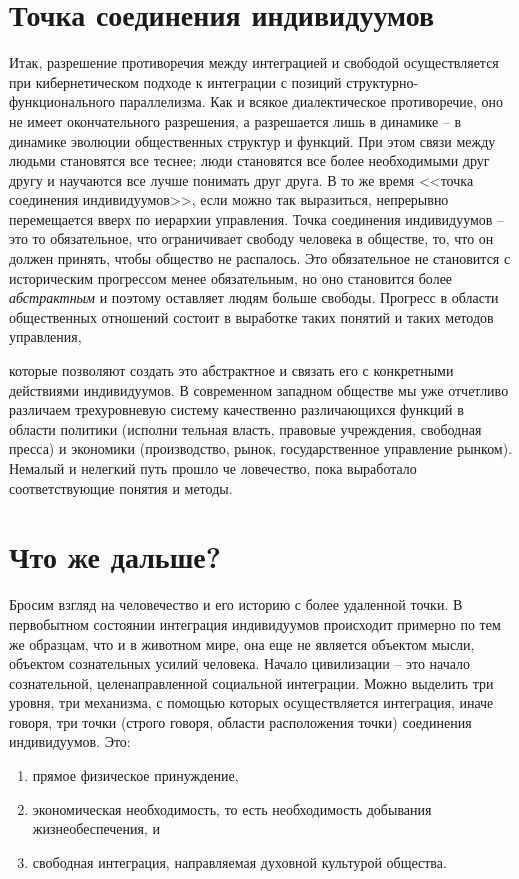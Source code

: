 \documentclass{book}
\begin{document}
\section{Точка соединения индивидуумов}

Итак, разрешение противоречия между интеграцией и свободой осуществляется при 
кибернетическом подходе к интеграции с позиций структурно-функционального 
параллелизма. Как и всякое диалектическое противоречие, оно не имеет окон­чательного 
разрешения, а разрешается лишь в динамике -- в динамике эволюции общественных 
структур и функций. При этом связи между людьми становятся все теснее; люди 
становятся все более необходимыми друг другу и научаются все лучше понимать друг 
друга. В то же время <<точка соединения индивидуумов>>, если можно так выразиться, 
непрерывно перемещается вверх по иерархии управления. Точка соединения индивидуумов 
-- это то обязательное, что ограничивает свободу человека в обществе, то, что он 
должен принять, чтобы общество не распалось. Это обязательное не становится с 
историческим прогрессом менее обязательным, но оно становится более 
\textit{абстрактным}  и поэтому оставляет людям больше свободы. Прогресс в области 
общественных отношений состоит в выработке таких понятий и таких методов управления,
 
которые позволяют создать это абстрактное и связать его с конкретными действиями 
индивидуумов. В современном западном обществе мы уже отчетливо различаем 
трехуровневую систему качественно различающихся функций в области политики (исполни­
тельная власть, правовые учреждения, свободная пресса) и эко­номики (производство, 
рынок, государственное управление рынком). Немалый и нелегкий путь прошло че
ловечество, пока выработало соответствующие понятия и методы.


\section{Что же дальше?}

Бросим взгляд на человечество и его историю с более уда­ленной точки. В первобытном 
состоянии интеграция индивиду­умов происходит примерно по тем же образцам, что и в 
живот­ном мире, она еще не является объектом мысли, объектом со­знательных усилий 
человека. Начало цивилизации -- это начало сознательной, целенаправленной социальной 
интеграции. Можно выделить три уровня, три механизма, с помощью которых 
осуществляется интеграция, иначе говоря, три точки (строго говоря, области 
расположения точки) соединения индивидуумов. Это:
\begin{enumerate}
 \item прямое физическое принуждение,
 \item экономическая необходимость, то есть необходимость добывания жизнеобеспечения, и
 \item свободная интеграция, направляемая духовной культурой общества. 
\end{enumerate}
\end{document}
